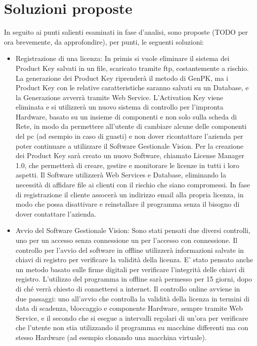 \section{Soluzioni proposte}

In seguito ai punti salienti esaminati in fase d’analisi, sono proposte (TODO per ora brevemente, da approfondire), per punti, le seguenti soluzioni:
\begin{itemize}

\item	Registrazione di una licenza: In primis si vuole eliminare il sistema dei Product Key salvati in un file, scaricato tramite ftp, costantemente a rischio. La generazione dei Product Key riprenderà il metodo di GenPK, ma i Product Key con le relative caratteristiche saranno salvati su un Database, e la Generazione avverrà tramite Web Service. L’Activation Key viene eliminata e si utilizzerà un nuovo sistema di controllo per l’impronta Hardware, basato su un insieme di componenti e non solo sulla scheda di Rete, in modo da permettere all’utente di cambiare alcune delle componenti del pc (ad esempio in caso di guasti) e non dover ricontattare l’azienda per poter continuare a utilizzare il Software Gestionale Vision. Per la creazione dei Product Key sarà creato un nuovo Software, chiamato License Manager 1.0, che permetterà di creare, gestire e monitorare le licenze in tutti i loro aspetti. Il Software utilizzerà Web Services e Database, eliminando la necessità di affidare file ai clienti con il rischio che siano compromessi. In fase di registrazione il cliente assocerà un indirizzo email alla propria licenza, in modo che possa disattivare e reinstallare il programma senza il bisogno di dover contattare l’azienda.
\item	Avvio del Software Gestionale Vision:  Sono stati pensati due diversi controlli, uno per un accesso senza connessione un per l’accesso con connessione. Il controllo per l’avvio del software in offline utilizzerà informazioni salvate in chiavi di registro per verificare la validità della licenza. E’ stato pensato anche un metodo basato sulle firme digitali per verificare l’integrità delle chiavi di registro. L’utilizzo del programma in offline sarà permesso per 15 giorni, dopo di ché verrà chiesto di connettersi a internet. Il controllo online avviene in due passaggi: uno all’avvio che controlla la validità della licenza in termini di data di scadenza, bloccaggio e componente Hardware, sempre tramite Web Service, e il secondo che si esegue a intervalli regolari di un’ora per verificare che l’utente non stia utilizzando il programma su macchine differenti ma con stesso Hardware (ad esempio clonando una macchina virtuale).

\end{itemize}
